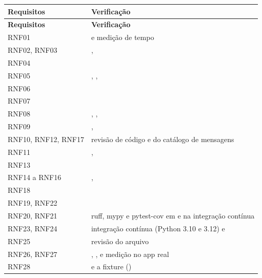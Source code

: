 \begin{singlespace}
\small
\begin{tabularx}{\textwidth}{|P{2.4cm}|L|}
\hline
\textbf{Requisitos} & \textbf{Verificação} \\ \hline
\endfirsthead
\hline
\textbf{Requisitos} & \textbf{Verificação} \\ \hline
\endhead
RNF01 &  e medição de tempo \\ \hline
RNF02, RNF03 & ,  \\ \hline
RNF04 &  \\ \hline
RNF05 & , ,  \\ \hline
RNF06 &  \\ \hline
RNF07 &  \\ \hline
RNF08 & , ,  \\ \hline
RNF09 & ,  \\ \hline
RNF10, RNF12, RNF17 & revisão de código e do catálogo de mensagens \\ \hline
RNF11 & ,  \\ \hline
RNF13 &  \\ \hline
RNF14 a RNF16 & ,  \\ \hline
RNF18 &  \\ \hline
RNF19, RNF22 &  \\ \hline
RNF20, RNF21 & ruff, mypy e pytest-cov em  e na integração contínua \\ \hline
RNF23, RNF24 & integração contínua (Python 3.10 e 3.12) e  \\ \hline
RNF25 & revisão do arquivo  \\ \hline
RNF26, RNF27 & , ,  e medição no app real \\ \hline
RNF28 &  e a fixture  () \\ \hline
\end{tabularx}
\end{singlespace}


